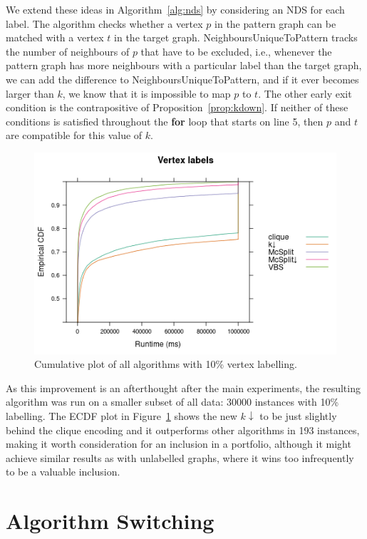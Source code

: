 \documentclass{l4proj}
\theoremstyle{definition}
\theoremstyle{remark}
\begin{document}
We extend these ideas in Algorithm~\ref{alg:nds} by considering an NDS for each
label. The algorithm checks whether a vertex $p$ in the pattern graph can be
matched with a vertex $t$ in the target graph.
\textsf{NeighboursUniqueToPattern} tracks the number of neighbours of $p$ that
have to be excluded, i.e., whenever the pattern graph has more neighbours with a
particular label than the target graph, we can add the difference to
\textsf{NeighboursUniqueToPattern}, and if it ever becomes larger than $k$, we
know that it is impossible to map $p$ to $t$. The other early exit condition is
the contrapositive of Proposition~\ref{prop:kdown}. If neither of these
conditions is satisfied throughout the \textbf{for} loop that starts on line 5,
then $p$ and $t$ are compatible for this value of $k$.

\begin{figure}
  \centering
  \includegraphics[scale=0.5]{images/ecdf_kdown.png}
  \caption{Cumulative plot of all algorithms with 10\% vertex labelling.}
  \label{fig:ecdf_kdown}
\end{figure}

As this improvement is an afterthought after the main experiments, the resulting
algorithm was run on a smaller subset of all data: \num{30000} instances with
10\% labelling. The ECDF plot in Figure~\ref{fig:ecdf_kdown} shows the new
$k{\downarrow}$ to be just slightly behind the clique encoding and it outperforms
other algorithms in 193 instances, making it worth consideration for an
inclusion in a portfolio, although it might achieve similar results as with
unlabelled graphs, where it wins too infrequently to be a valuable inclusion.

\section{Algorithm Switching}
\end{document}
